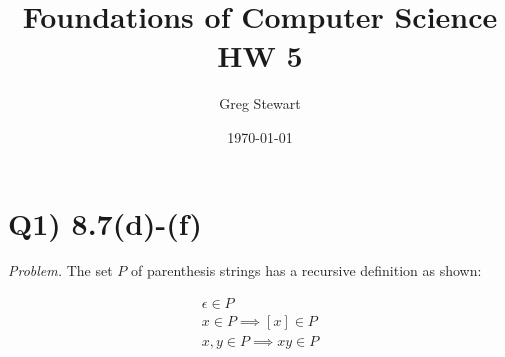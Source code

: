 \documentclass{article}
\title{Foundations of Computer Science HW 5}
\author{Greg Stewart}
\date{\today}
\begin{document}
\maketitle

\section*{Q1) 8.7(d)-(f)}

\textit{Problem.} The set $P$ of parenthesis strings has a recursive definition as shown:

\begin{align*}
  \epsilon \in P \\
  x \in P \implies [x] \in P \\
  x,y \in P \implies xy \in P
\end{align*}
\end{document}
